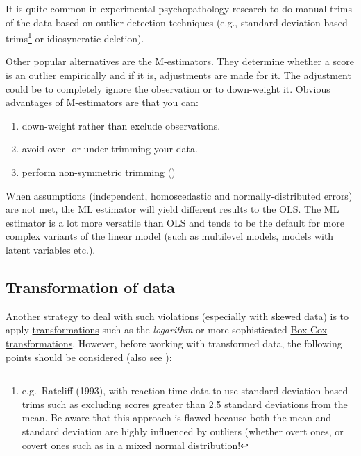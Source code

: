 \documentclass[
]{article}
\providecommand{\tightlist}{%
  \setlength{\itemsep}{0pt}\setlength{\parskip}{0pt}}
\begin{document}
It is quite common in experimental psychopathology research to do manual trims of the data based on outlier detection techniques (e.g., standard deviation based trims\footnote{ e.g.~Ratcliff (1993), with reaction time data to use standard deviation based trims such as excluding scores greater than 2.5 standard deviations from the mean. Be aware that this approach is flawed because both the mean and standard deviation are highly influenced by outliers (whether overt ones, or covert ones such as in a mixed normal distribution!} or idiosyncratic deletion).

Other popular alternatives are the M-estimators. They determine whether a score is an outlier empirically and if it is, adjustments are made for it. The adjustment could be to completely ignore the observation or to down-weight it. Obvious advantages of M-estimators are that you can:

\begin{enumerate}
\def\labelenumi{\arabic{enumi}.}
\tightlist
\item
  down-weight rather than exclude observations.
\item
  avoid over- or under-trimming your data.
\item
  perform non-symmetric trimming ()
\end{enumerate}

When assumptions (independent, homoscedastic and normally-distributed errors) are not met, the ML estimator will yield different results to the OLS. The ML estimator is a lot more versatile than OLS and tends to be the default for more complex variants of the linear model (such as multilevel models, models with latent variables etc.).

\subsection*{Transformation of data}\label{transformation-of-data}

Another strategy to deal with such violations (especially with skewed data) is to apply \href{https://en.wikipedia.org/wiki/Data_transformation_(statistics)}{transformations}
such as the \emph{logarithm} or more sophisticated \href{https://de.wikipedia.org/wiki/Box-Cox-Transformation}{Box-Cox transformations}. However, before working with transformed data, the following points should be considered (also see ):
\end{document}
